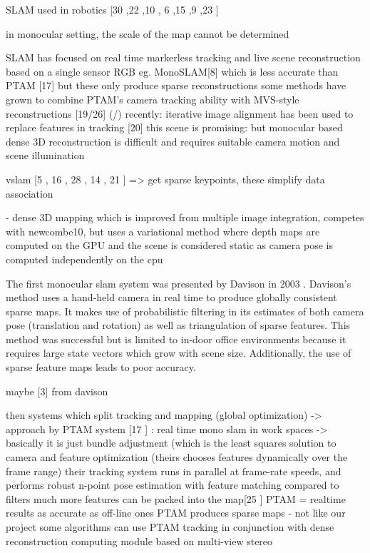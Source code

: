 
SLAM used in robotics [30 \cite{Thrun02Robotic},22 \cite{Nuchter056d},10 \cite{Grisetti07Efficient}, 6 \cite{Dellaert06Square},15 \cite{Kaess08Isam},9 \cite{Frese05Multilevel},23 \cite{Olson06Fast}]


in monocular setting, the scale of the map cannot be  determined \cite{Endres12Evaluation}

SLAM has focused on real time markerless tracking and live scene reconstruction based on a single sensor RGB eg. MonoSLAM[8] \cite{Davison03Real} which is less accurate than PTAM [17] \cite{Klein07Parallel}  but these only produce sparse reconstructions
some methods have grown to combine PTAM's camera tracking ability with MVS-style reconstructions [19/26] (\cite{Newcombe10Live}/\cite{Stuhmer10Real})
recently: iterative image alignment has been used to replace features in tracking [20] \cite{Newcombe11Dtam}
this scene is promising: but monocular based dense 3D reconstruction is difficult and requires suitable camera motion and scene illumination


vslam [5 \cite{Davison03Real} , 16 \cite{Klein07Parallel}, 28 \cite{Strasdat10Real}, 14 \cite{Jin00Real}, 21 \cite{Nister05Preemptive}] => get sparse keypoints,  
these simplify data association

\cite{Stuhmer10Real} - dense 3D mapping which is improved from multiple image integration, competes with newcombe10, but uses a variational method where depth maps are computed on the GPU and the scene is considered static as camera pose is computed independently on the cpu


The first monocular slam system was presented by Davison in 2003 \cite{Davison03Real}. Davison's method uses a hand-held camera in real time to produce globally consistent sparse maps. It makes use of probabilistic filtering in its estimates of both camera pose (translation and rotation) as well as triangulation of sparse features. This method was successful but is limited to in-door office environments because it requires large state vectors which grow with scene size. Additionally, the use of sparse feature maps leads to poor accuracy. 

maybe [3] from davison

then systems which split tracking and mapping (global optimization) -> approach by PTAM system [17 \cite{Klein07Parallel}]
: real time mono slam in work spaces -> basically it is just bundle adjustment (which is the least squares solution to camera and feature optimization (theirs chooses features dynamically over the frame range)
their tracking system runs in parallel at frame-rate speeds, and performs robust n-point pose estimation with feature matching
compared to filters much more features can be packed into the map[25 \cite{Strasdat10Real} ]
PTAM = realtime results as accurate as off-line ones
PTAM produces sparse maps - not like our project
some algorithms can use PTAM tracking in conjunction with dense reconstruction computing module based on multi-view stereo 


